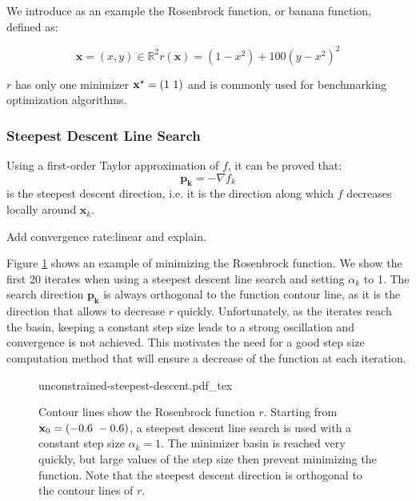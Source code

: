 We introduce as an example the Rosenbrock function, or banana
function, defined as:

\begin{equation}
\mathbf{x} = (x,y) \in \mathbb R^2 r(\mathbf{x}) =
(1-x^2)+100(y-x^2)^2
\end{equation}

$r$ has only one minimizer $\mathbf{x}^{\star} = (1~1)$ and is commonly
used for benchmarking optimization algorithms.

\subsubsection{Steepest Descent Line Search}

Using a first-order Taylor approximation of $f$, it can be proved that:
\begin{equation}
\mathbf{p_k} = -\nabla f_k
\end{equation}
is the steepest descent direction, i.e. it is the direction along
which $f$ decreases locally around $\mathbf{x}_k$.

Add convergence rate:linear and explain.

Figure \ref{fig:chap3-unconstrained-steepest-descent} shows an example
of minimizing the Rosenbrock function. We show the first 20 iterates
when using a steepest descent line search and setting $\alpha_k$ to
1. The search direction $\mathbf{p_k}$ is always orthogonal to the
function contour line, as it is the direction that allows to decrease
$r$ quickly. Unfortunately, as the iterates reach the basin, keeping a
constant step size leads to a strong oscillation and convergence is
not achieved. This motivates the need for a good step size computation
method that will ensure a decrease of the function at each iteration.

\begin{figure}
  \centering
      {\def\svgwidth{0.5\linewidth}
        {\footnotesize
          
                     {unconstrained-steepest-descent.pdf_tex}
        }
      }
      \caption{Contour lines show the Rosenbrock function
        $r$. Starting from $\mathbf{x}_0=(-0.6~-0.6)$, a steepest
        descent line search is used with a constant step size
        $\alpha_k=1$. The minimizer basin is reached very quickly,
        but large values of the step size then prevent minimizing the
        function. Note that the steepest descent direction is
        orthogonal to the contour lines of $r$.}
      \label{fig:chap3-unconstrained-steepest-descent}
\end{figure}

